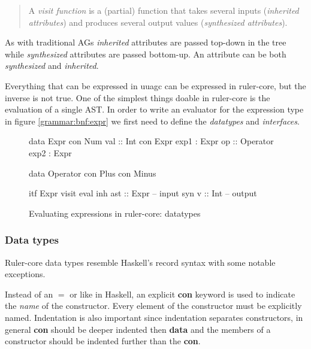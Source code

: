 \begin{quotation}
A \emph{visit function}\cite{visitag} is a (partial) function that takes several inputs (\emph{inherited attributes}) and produces several output values (\emph{synthesized attributes}).
\end{quotation}

As with traditional AGs \emph{inherited} attributes are passed top-down in the tree while \emph{synthesized} attributes are passed bottom-up. An attribute can be both \emph{synthesized} and \emph{inherited}.

Everything that can be expressed in uuagc can be expressed in ruler-core, but the inverse is not true. One of the simplest things doable in ruler-core is the evaluation of a single AST. In order to write an evaluator for the expression type in figure \ref{grammar:bnf:expr} we first need to define the \emph{datatypes} and \emph{interfaces}.

\begin{figure}[H]
\begin{minipage}[t]{0.4\linewidth}
\begin{code}
data Expr
  con Num
    val     :: Int
  con Expr
    exp1    :  Expr
    op      :: Operator
    exp2    :  Expr
\end{code}
\end{minipage}
\begin{minipage}[t]{0.6\linewidth}
\begin{code}
data Operator
  con Plus
  con Minus

itf Expr
  visit eval
    inh ast :: Expr -- input
    syn v   :: Int  -- output
\end{code}
\end{minipage}
\caption{Evaluating expressions in ruler-core: datatypes}
\label{example:tutorial1:datatypes}
\end{figure}

\subsubsection{Data types}
Ruler-core data types resemble Haskell's record syntax with some notable exceptions.

Instead of an $=$ or \textbar \space like in Haskell, an explicit \textbf{con} keyword is used to indicate the \emph{name} of the constructor. Every element of the constructor must be explicitly named. Indentation is also important since indentation separates constructors, in general \textbf{con} should be deeper indented then \textbf{data} and the members of a constructor should be indented further than the \textbf{con}. 

